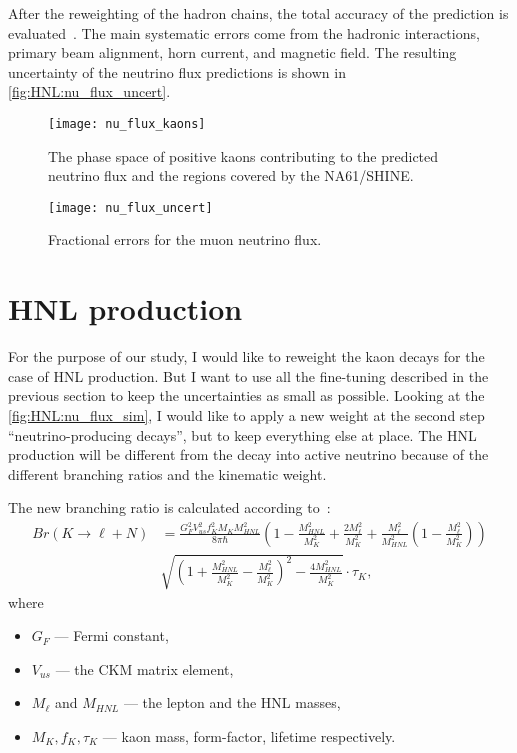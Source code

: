 \documentclass[../main.tex]{subfiles}
\begin{document}
After the reweighting of the hadron chains, the total accuracy of the prediction is evaluated~\cite{Abe2013}. The main systematic errors come from the hadronic interactions, primary beam alignment, horn current, and magnetic field. The resulting uncertainty of the neutrino flux predictions is shown in \autoref{fig:HNL:nu_flux_uncert}.

\begin{figure}[!ht]
    \begin{minipage}[!ht]{0.49\linewidth}
        \centering
        \texttt{[image: nu\_flux\_kaons]}
        \caption{The phase space of positive kaons contributing to the predicted neutrino flux and the regions covered by the NA61/SHINE.}
        \label{fig:HNL:kaon_ps}
    \end{minipage}
    \hfill
    \begin{minipage}[!ht]{0.49\linewidth}
        \centering
        \texttt{[image: nu\_flux\_uncert]}
        \caption{Fractional errors for the muon neutrino flux.}
        \label{fig:HNL:nu_flux_uncert}
    \end{minipage}
\end{figure}


\section{HNL production}
For the purpose of our study, I would like to reweight the kaon decays for the case of HNL production. But I want to use all the fine-tuning described in the previous section to keep the uncertainties as small as possible. Looking at the \autoref{fig:HNL:nu_flux_sim}, I would like to apply a new weight at the second step ``neutrino-producing decays'', but to keep everything else at place. The HNL production will be different from the decay into active neutrino because of the different branching ratios and the kinematic weight.

The new branching ratio is calculated according to~\cite{Gorbunov2007}:
\begin{equation}
    \begin{split}
    Br(K\rightarrow \ell+N)&=\frac{G_F^2 V_{us}^2 f_K^2 M_K M_{HNL}^2}{8\pi\hbar}\left(1-\frac{M_{HNL}^2}{M_K^2}+\frac{2M_\ell ^2}{M_K^2}+\frac{M_\ell^2}{M_{HNL}^2}\left(1-\frac{M_\ell^2}{M_K^2}\right)\right) \\
&\sqrt{\left(1+\frac{M_{HNL}^2}{M_K^2}-\frac{M_\ell^2}{M_K^2}\right)^2-\frac{4M_{HNL}^2}{M_K^2}} \cdot\tau_K,
    \end{split}
    \label{eq:HNL:Kdecay}
\end{equation}
where
\begin{itemize}
\item $G_F$ --- Fermi constant,
\item $V_{us}$ --- the CKM matrix element,
\item $M_\ell$ and $M_{HNL}$ --- the lepton and the HNL masses,
\item $M_K, f_K, \tau_K$ --- kaon mass, form-factor, lifetime respectively.
\end{itemize}
\end{document}
